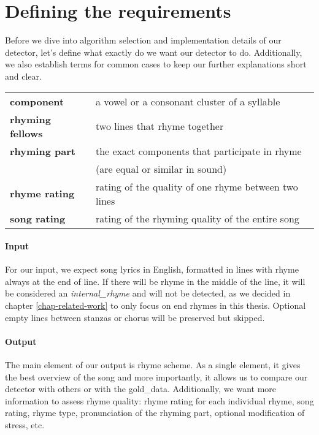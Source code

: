 \section{Defining the requirements}\label{defining_the_requirements}
Before we dive into algorithm selection and implementation details of our detector, let's define what exactly do we want our detector to do. Additionally, we also establish terms for common cases to keep our further explanations short and clear.
\begin{table}[h!]
	\centering
	\begin{tabular}{>{\bfseries}l l} 
		component & a vowel or a consonant cluster of a syllable\\
		rhyming fellows & two lines that rhyme together\\
		rhyming part & the exact components that participate in rhyme \\&(are equal or similar in sound)\\
		rhyme rating & rating of the quality of one rhyme between two lines\\
		song rating & rating of the rhyming quality of the entire song\\
	\end{tabular}
	\label{terms}
\end{table}

\paragraph{Input}
For our input, we expect song lyrics in English, formatted in lines with rhyme always at the end of line. If there will be rhyme in the middle of the line, it will be considered an \textit{\gls{internal_rhyme}} and will not be detected, as we decided in chapter \ref{chap-related-work} to only focus on end rhymes in this thesis. Optional empty lines between stanzas or chorus will be preserved but skipped.

\paragraph{Output}
The main element of our output is rhyme scheme. As a single element, it gives the best overview of the song and more importantly, it allows us to compare our detector with others or with the \gls{gold_data}. Additionally, we want more information to assess rhyme quality: rhyme rating for each individual rhyme, song rating, rhyme type, pronunciation of the rhyming part, optional modification of stress, etc.


